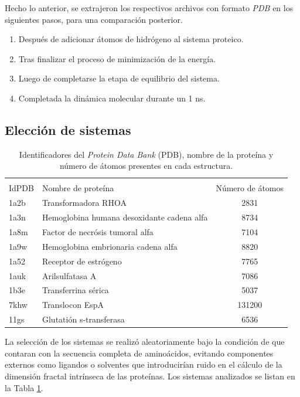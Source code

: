  	
 	
 	Hecho lo anterior, se extrajeron los respectivos archivos con formato \textit{PDB} en 
 	los siguientes pasos, para una comparaci\'{o}n posterior.
 	
 	\begin{enumerate}
 		\item Despu\'{e}s de adicionar \'{a}tomos de hidr\'{o}geno al sistema proteico. 
 		\item Tras finalizar el proceso de minimizaci\'{o}n de la energ\'{i}a.
 		\item Luego de completarse la etapa de equilibrio del sistema.
 		\item Completada la din\'{a}mica molecular durante un 1 ns.
 	\end{enumerate}
 	
 	
 	\subsection{Elecci\'{o}n de sistemas}
 	
 	\begin{table}[h!]
 		\centering
 		\begin{tabular}{llc}
 			\multicolumn{3}{c}{} \\ 
 			IdPDB & Nombre de prote\'{i}na & N\'{u}mero de \'{a}tomos \\
 			\hline
 			1a2b & Transformadora RHOA & 2831 \\
 			1a3n & Hemoglobina humana desoxidante cadena alfa & 8734 \\
 			1a8m & Factor de necr\'{o}sis tumoral alfa & 7104 \\
 			1a9w & Hemoglobina embrionaria cadena alfa & 8820 \\
 			1a52 & Receptor de estr\'{o}geno & 7765 \\
 			1auk & Arilsulfatasa A & 7086 \\
 			1b3e & Transferrina s\'{e}rica & 5037 \\
 			7khw & Translocon EspA & 131200 \\
 			11gs & Glutati\'{o}n s-transferasa & 6536 \\ 
 			\hline
 		\end{tabular}
 		\caption{Identificadores del \emph{Protein Data Bank} (PDB), nombre de la prote\'{i}na y n\'{u}mero de \'{a}tomos presentes en cada estructura.}
 		\label{Tabla:ids9}
 	\end{table}
 	
 	
 	
 	La selecci\'{o}n de los sistemas se realiz\'{o} aleatoriamente bajo la condici\'{o}n de que contaran con la secuencia completa de amino\'{a}cidos, evitando componentes externos como ligandos o solventes que introducir\'{i}an ruido en el c\'{a}lculo de la dimensi\'{o}n fractal intr\'{i}nseca de las prote\'{i}nas. Los sistemas analizados se listan en la Tabla \ref{Tabla:ids9}.
 
